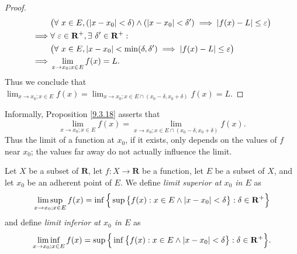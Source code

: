 \begin{proof}
\begin{align*}
                 & \big(\forall\ x \in E, (\abs*{x - x_0} < \delta) \land (\abs*{x - x_0} < \delta') \implies \abs*{f(x) - L} \leq \varepsilon\big)         \\
        \implies & \forall\ \varepsilon \in \mathbf{R}^+, \exists\ \delta' \in \mathbf{R}^+ :                                                               \\
                 & \big(\forall\ x \in E, \abs*{x - x_0} < \min(\delta, \delta') \implies \abs*{f(x) - L} \leq \varepsilon\big)                             \\
        \implies & \lim_{x \to x_0 ; x \in E} f(x) = L.
    \end{align*}
    Thus we conclude that \(\lim_{x \to x_0 ; x \in E} f(x) = \lim_{x \to x_0 ; x \in E \cap (x_0 - \delta, x_0 + \delta)} f(x) = L\).
\end{proof}

\begin{note}
    Informally, Proposition \ref{9.3.18} asserts that
    \[
        \lim_{x \to x_0 ; x \in E} f(x) = \lim_{x \to x_0 ; x \in E \cap (x_0 - \delta, x_0 + \delta)} f(x).
    \]
    Thus the limit of a function at \(x_0\), if it exists, only depends on the values of \(f\) near \(x_0\);
    the values far away do not actually influence the limit.
\end{note}

\begin{additional corollary}\label{ac 9.3.1}
Let \(X\) be a subset of \(\mathbf{R}\), let \(f : X \to \mathbf{R}\) be a function, let \(E\) be a subset of \(X\), and let \(x_0\) be an adherent point of \(E\).
We define \emph{limit superior at \(x_0\) in \(E\)} as
\[
    \limsup_{x \to x_0 ; x \in E} f(x) = \inf\Big\{\sup\big\{f(x) : x \in E \land \abs*{x - x_0} < \delta\big\} : \delta \in \mathbf{R}^+\Big\}
\]
and define \emph{limit inferior at \(x_0\) in \(E\)} as
\[
    \liminf_{x \to x_0 ; x \in E} f(x) = \sup\Big\{\inf\big\{f(x) : x \in E \land \abs*{x - x_0} < \delta\big\} : \delta \in \mathbf{R}^+\Big\}.
\]
\end{additional corollary}

